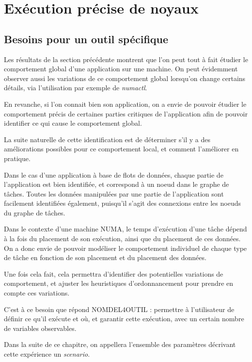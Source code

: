 \section{Exécution précise de noyaux}\label{sec:contribs:outil}

\subsection{Besoins pour un outil spécifique}

Les résultats de la section précédente montrent que l'on peut tout à fait étudier le comportement global d'une application sur une machine. On peut évidemment observer aussi les variations de ce comportement global lorsqu'on change certains détails, via l'utilisation par exemple de \emph{numactl}.

En revanche, si l'on connait bien son application, on a envie de pouvoir étudier le comportement précis de certaines parties critiques de l'application afin de pouvoir identifier ce qui cause le comportement global.

La suite naturelle de cette identification est de déterminer s'il y a des améliorations possibles pour ce comportement local, et comment l'améliorer en pratique.

Dans le cas d'une application à base de flots de données, chaque partie de l'application est bien identifiée, et correspond à un noeud dans le graphe de tâches.
Toutes les données manipulées par une partie de l'application sont facilement identifiées également, puisqu'il s'agit des connexions entre les noeuds du graphe de tâches.

Dans le contexte d'une machine NUMA, le temps d'exécution d'une tâche dépend à la fois du placement de son exécution, ainsi que du placement de ces données. On a donc envie de pouvoir modéliser le comportement individuel de chaque type de tâche en fonction de son placement et du placement des données.

Une fois cela fait, cela permettra d'identifier des potentielles variations de comportement, et ajuster les heuristiques d'ordonnancement pour prendre en compte ces variations.

C'est à ce besoin que répond NOMDEL4OUTIL : permettre à l'utilisateur de définir ce qu'il exécute et où, et garantir cette exécution, avec un certain nombre de variables observables.

Dans la suite de ce chapitre, on appellera l'ensemble des paramètres décrivant cette expérience un \emph{scenario}.

